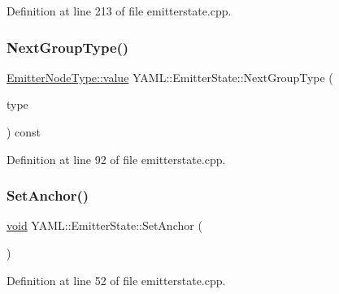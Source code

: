 Definition at line 213 of file emitterstate.\+cpp.

\mbox{\label{class_y_a_m_l_1_1_emitter_state_a31b4f87f2f1f0b6815a232a3dc0177bb}} 
\subsubsection{\texorpdfstring{NextGroupType()}{NextGroupType()}}
{\footnotesize\ttfamily \mbox{\hyperlink{struct_y_a_m_l_1_1_emitter_node_type_ac42d64defd19943e78fd749faade2103}{Emitter\+Node\+Type\+::value}} Y\+A\+M\+L\+::\+Emitter\+State\+::\+Next\+Group\+Type (\begin{DoxyParamCaption}\item[{\mbox{\hyperlink{struct_y_a_m_l_1_1_group_type_aab9271cd8999a6694cb10670e6a5496f}{Group\+Type\+::value}}}]{type }\end{DoxyParamCaption}) const}



Definition at line 92 of file emitterstate.\+cpp.

\mbox{\label{class_y_a_m_l_1_1_emitter_state_a26b4eebc3469aef4bb4727dd3570ffb9}} 
\subsubsection{\texorpdfstring{SetAnchor()}{SetAnchor()}}
{\footnotesize\ttfamily \mbox{\hyperlink{glad_8h_a950fc91edb4504f62f1c577bf4727c29}{void}} Y\+A\+M\+L\+::\+Emitter\+State\+::\+Set\+Anchor (\begin{DoxyParamCaption}{ }\end{DoxyParamCaption})}



Definition at line 52 of file emitterstate.\+cpp.

\mbox{\label{class_y_a_m_l_1_1_emitter_state_a9fa41dac72f2ea2800a621c505dafc65}} 
